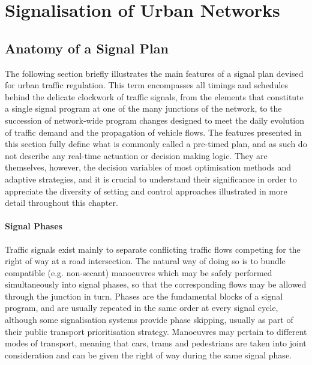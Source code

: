 \chapter{Signalisation of Urban Networks}
\section{Anatomy of a Signal Plan} \label{s:anatomy}
The following section briefly illustrates the main features of a signal plan devised for urban traffic regulation. This term encompasses all timings and schedules behind the delicate clockwork of traffic signals, from the elements that constitute a single signal program at one of the many junctions of the network, to the succession of network-wide program changes designed to meet the daily evolution of traffic demand and the propagation of vehicle flows.
The features presented in this section fully define what is commonly called a pre-timed plan, and as such do not describe any real-time actuation or decision making logic.
They are themselves, however, the decision variables of most optimisation methods and adaptive strategies, and it is crucial to understand their significance in order to appreciate the diversity of setting and control approaches illustrated in more detail throughout this chapter.


\subsubsection{Signal Phases}
Traffic signals exist mainly to separate conflicting traffic flows competing for the right of way at a road intersection. The natural way of doing so is to bundle compatible (e.g. non-secant) manoeuvres which may be safely performed simultaneously into signal phases, so that the corresponding flows may be allowed through the junction in turn.
Phases are the fundamental blocks of a signal program, and are usually repeated in the same order at every signal cycle, although some signalisation systems provide phase skipping, usually as part of their public transport prioritisation strategy.
Manoeuvres may pertain to different modes of transport, meaning that cars, trams and
pedestrians are taken into joint consideration and can be given the right of way during the
same signal phase.

